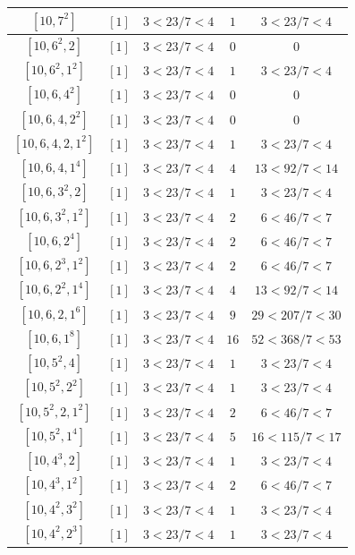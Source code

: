 \documentclass{article}%
\begin{document}
\begin{center}
\begin{longtable}{||c|c|c|c|c||}
$[10, 7^{2}]$ & $[1]$ & $3 < 23/7 < 4$ & $1$ & $3 < 23/7 < 4$ \\ \hline 
$[10, 6^{2}, 2]$ & $[1]$ & $3 < 23/7 < 4$ & $0$ & $0$ \\ \hline 
$[10, 6^{2}, 1^{2}]$ & $[1]$ & $3 < 23/7 < 4$ & $1$ & $3 < 23/7 < 4$ \\ \hline 
$[10, 6, 4^{2}]$ & $[1]$ & $3 < 23/7 < 4$ & $0$ & $0$ \\ \hline 
$[10, 6, 4, 2^{2}]$ & $[1]$ & $3 < 23/7 < 4$ & $0$ & $0$ \\ \hline 
$[10, 6, 4, 2, 1^{2}]$ & $[1]$ & $3 < 23/7 < 4$ & $1$ & $3 < 23/7 < 4$ \\ \hline 
$[10, 6, 4, 1^{4}]$ & $[1]$ & $3 < 23/7 < 4$ & $4$ & $13 < 92/7 < 14$ \\ \hline 
$[10, 6, 3^{2}, 2]$ & $[1]$ & $3 < 23/7 < 4$ & $1$ & $3 < 23/7 < 4$ \\ \hline 
$[10, 6, 3^{2}, 1^{2}]$ & $[1]$ & $3 < 23/7 < 4$ & $2$ & $6 < 46/7 < 7$ \\ \hline 
$[10, 6, 2^{4}]$ & $[1]$ & $3 < 23/7 < 4$ & $2$ & $6 < 46/7 < 7$ \\ \hline 
$[10, 6, 2^{3}, 1^{2}]$ & $[1]$ & $3 < 23/7 < 4$ & $2$ & $6 < 46/7 < 7$ \\ \hline 
$[10, 6, 2^{2}, 1^{4}]$ & $[1]$ & $3 < 23/7 < 4$ & $4$ & $13 < 92/7 < 14$ \\ \hline 
$[10, 6, 2, 1^{6}]$ & $[1]$ & $3 < 23/7 < 4$ & $9$ & $29 < 207/7 < 30$ \\ \hline 
$[10, 6, 1^{8}]$ & $[1]$ & $3 < 23/7 < 4$ & $16$ & $52 < 368/7 < 53$ \\ \hline 
$[10, 5^{2}, 4]$ & $[1]$ & $3 < 23/7 < 4$ & $1$ & $3 < 23/7 < 4$ \\ \hline 
$[10, 5^{2}, 2^{2}]$ & $[1]$ & $3 < 23/7 < 4$ & $1$ & $3 < 23/7 < 4$ \\ \hline 
$[10, 5^{2}, 2, 1^{2}]$ & $[1]$ & $3 < 23/7 < 4$ & $2$ & $6 < 46/7 < 7$ \\ \hline 
$[10, 5^{2}, 1^{4}]$ & $[1]$ & $3 < 23/7 < 4$ & $5$ & $16 < 115/7 < 17$ \\ \hline 
$[10, 4^{3}, 2]$ & $[1]$ & $3 < 23/7 < 4$ & $1$ & $3 < 23/7 < 4$ \\ \hline 
$[10, 4^{3}, 1^{2}]$ & $[1]$ & $3 < 23/7 < 4$ & $2$ & $6 < 46/7 < 7$ \\ \hline 
$[10, 4^{2}, 3^{2}]$ & $[1]$ & $3 < 23/7 < 4$ & $1$ & $3 < 23/7 < 4$ \\ \hline 
$[10, 4^{2}, 2^{3}]$ & $[1]$ & $3 < 23/7 < 4$ & $1$ & $3 < 23/7 < 4$ \\ \hline 

\end{longtable}
\end{center}
\end{document}
